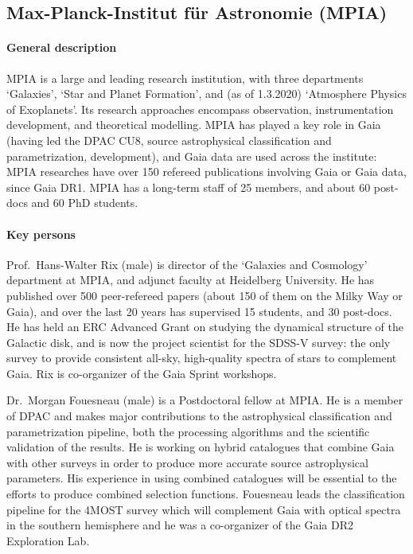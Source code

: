 \subsection{Max-Planck-Institut f\"ur Astronomie (MPIA)}
\label{sec:mpg}

\paragraph{General description}
MPIA is a large and leading research institution, with three departments `Galaxies', `Star and Planet Formation', and (as of 1.3.2020) `Atmosphere Physics of Exoplanets'. Its research approaches encompass observation, instrumentation development, and theoretical modelling. MPIA has played a key role in Gaia (having led the DPAC CU8, source astrophysical classification and parametrization, development), and Gaia data are used across the institute: MPIA researches have over 150 refereed publications involving Gaia or Gaia data, since Gaia DR1. MPIA has a long-term staff of 25 members, and about 60 post-docs and 60 PhD students.

\paragraph{Key persons} 
Prof.~Hans-Walter Rix (male) is director of the `Galaxies and Cosmology' department at MPIA, and adjunct faculty at Heidelberg University. He has published over 500 peer-refereed papers (about 150 of them on the Milky Way or Gaia), and over the last 20 years has supervised 15 students, and 30 post-docs. He has held an ERC Advanced Grant on studying the dynamical structure of the Galactic disk, and is now the project scientist for the SDSS-V survey: the only survey to provide consistent all-sky, high-quality spectra of stars to complement Gaia. Rix is co-organizer of the Gaia Sprint workshops.

Dr.~Morgan Fouesneau (male) is a Postdoctoral fellow at MPIA. He is a member of DPAC and makes major contributions to the astrophysical classification and parametrization pipeline, both the processing algorithms and the scientific validation of the results. He is working on hybrid catalogues that combine Gaia with other surveys in order to produce more accurate source astrophysical parameters. His experience in using combined catalogues will be essential to the efforts to produce combined selection functions. Fouesneau leads the classification pipeline for the 4MOST survey which will complement Gaia with optical spectra in the southern hemisphere and he was a co-organizer of the Gaia DR2 Exploration Lab.

